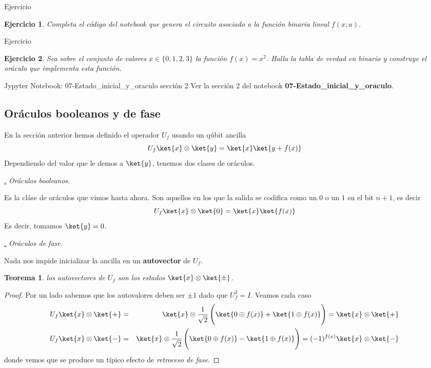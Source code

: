 \documentclass[a4paper,11pt]{book} %
\newtheorem{teorema_contador}{Teorema}
\newcommand{\Teorema}[1]{
		\begin{mybox_gray2}{}
			\begin{teorema_contador}
				 #1 
			\end{teorema_contador} 
		\end{mybox_gray2}
	}
\newtheorem{ejercicio_contador}{Ejercicio}
\newcommand{\Ejercicio}[1]{
		\begin{mybox_gray}{Ejercicio} 
			\begin{ejercicio_contador}
				 #1 
			\end{ejercicio_contador} 
		\end{mybox_gray}
	}
\numberwithin{equation}{chapter}
\def\subsubiContadorIt{\par\addtocounter{subsubsection}{1}\underline{\it\thesubsubsection.}\hskip0.5cm \setcounter{subsubsubsectionIt}{0}}
\newcommand{\SubsubiIt}[1]{
		\subsubiContadorIt \textit{#1}
	}
\newcounter{subsubsubsectionIt}[subsubsection]
\begin{document}
	\Ejercicio{Completa el código del notebook que genera el circuito asociado a la función binaria lineal $f(x;a)$.}
	
	\Ejercicio{Sea sobre el conjunto de valores $x\in \{0,1,2,3\}$ la función $f(x) = x^2$. Halla la tabla de verdad 
	en binario y construye el oráculo que implementa esta función.}



	\begin{mybox_orange}{Jypyter Notebook: 07-Estado\_inicial\_y\_oraculo sección 2}
	Ver la sección 2 del notebook \textbf{07-Estado\_inicial\_y\_oraculo}.
	\end{mybox_orange}
	
    	
    	
    	\subsection{Oráculos booleanos y de fase}

En la sección anterior hemos definido el operador  $U_f$ usando un qúbit ancilla
$$
U_f \ket{x}\otimes\ket{y} = \ket{x}\ket{y + f(x)}
$$
Dependiendo del valor que le demos a $\ket{y}$, tenemos dos clases de oráculos. 


			\SubsubiIt{Oráculos booleanos.}

Es la cláse de oráculos que vimos hasta ahora. Son aquellos en los que la salida se codifica como un $0$ o un $1$ en el bit $n+1$, es decir
$$
U_f \ket{x}\otimes\ket{0} = \ket{x}\ket{f(x)}
$$
Es decir, tomamos $\ket{y} = 0$.

			\SubsubiIt{Oráculos de fase.} 

Nada nos impide inicializar la ancilla en un \textbf{autovector} de $U_f$. 

	\Teorema{
	los autovectores de $U_f$ son los estados $\ket{x}\otimes \ket{\pm}$.}
	
	\begin{proof}
	Por un lado sabemos que los autovalores deben ser $\pm 1$ dado que $U_f^2 = I$. Veamos cada caso
	\begin{eqnarray}
	U_f\ket{x}\otimes \ket{+} &=& \ket{x}\otimes \frac{1}{\sqrt{2}}\left( \rule{0mm}{6mm}\ket{0\oplus f(x)}+\ket{1\oplus f(x)} \right) 
	= 	\ket{x}\otimes \ket{+} \nonumber\\
	U_f\ket{x}\otimes \ket{-} &=& \ket{x}\otimes \frac{1}{\sqrt{2}}\left( \rule{0mm}{6mm} \ket{0\oplus f(x)}-\ket{1\oplus f(x)}\right) 
	= (-1)^{f(x)} \ket{x}\otimes \ket{-} \nonumber
	\end{eqnarray}
	donde vemos que se produce un típico efecto de \textit{retroceso de fase}.
	\end{proof}
\end{document}
